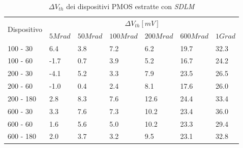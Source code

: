 \documentclass[12pt, letterpaper]{book}
\begin{document}
\begin{table}[H]
  \renewcommand{\arraystretch}{1.3}
  \begin{tabular}{m{2cm}  m{1.1cm} m{1.3cm} m{1.5cm} m{1.5cm} m{1.5cm} m{1cm}}
    \toprule
    \multirow{2}{*}{Dispositivo} & \multicolumn{6}{c}{$\Delta V_{th} [mV] $}                                                          \\
    \cmidrule{2-7}
                                 & $5Mrad$                            & $50Mrad$ & $100Mrad$ & $200Mrad$ & $600Mrad$ & $1Grad$ \\
    \midrule
    100 - 30                     & 6.4                                & 3.8      & 7.2       & 6.2       & 19.7      & 32.3    \\
    \hline
    100 - 60                     & -1.7                               & 0.7      & 3.9       & 5.2       & 16.7      & 24.2    \\
    \hline
    200 - 30                     & -4.1                               & 5.2      & 3.3       & 7.9       & 23.5      & 26.5    \\
    \hline
    200 - 60                     & -1.0                               & 0.4      & 2.4       & 8.1       & 17.6      & 26.0    \\
    \hline
    200 - 180                    & 2.8                                & 8.3      & 7.6       & 12.6      & 24.4      & 33.4    \\
    \hline
    600 - 30                     & 3.3                                & 7.6      & 7.3       & 10.2      & 23.4      & 36.0    \\
    \hline
    600 - 60                     & 1.6                                & 5.6      & 5.0       & 10.2      & 23.3      & 29.4    \\
    \hline
    600 - 180                    & 2.0                                & 3.7      & 3.2       & 9.5       & 23.1      & 32.8    \\
    \bottomrule
  \end{tabular}
  \caption{$\Delta V_{th}$ dei dispositivi PMOS estratte con \emph{SDLM}}
  \label{tab:deltaVthSDLMP}
\end{table}
\end{document}
